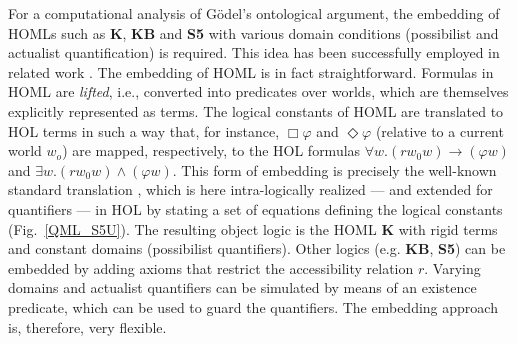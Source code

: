 \documentclass{article}
\newcommand{\imp}{{\rightarrow}}
\begin{document}
For a computational analysis of G\"odel's ontological argument, the embedding of HOMLs such as \textbf{K},
\textbf{KB} and \textbf{S5} with various domain conditions (possibilist and actualist quantification)
is required. This idea has been successfully employed in related work
\cite{C40}. The embedding of HOML is in fact
straightforward. Formulas in HOML are \emph{lifted}, i.e., converted into predicates
over worlds, which are themselves explicitly represented as
terms. The logical constants of HOML are translated to HOL terms in such a way that, for instance, 
$\Box \varphi$ and $\Diamond \varphi$ (relative to a current world
$w_o$) are mapped, respectively, to the HOL formulas
$\forall w. (r w_0 w) \imp (\varphi w)$ and
$\exists w. (r w_0 w) \wedge (\varphi w)$. This form of embedding is
precisely the well-known standard translation
\cite{DBLP:journals/logcom/Ohlbach91}, which is here intra-logically
realized --- and extended for quantifiers --- in HOL by stating a set
of equations defining the logical constants (Fig.~\ref{QML_S5U}). The
resulting object logic is the HOML \textbf{K} with rigid terms and constant
domains (possibilist quantifiers). Other logics (e.g. \textbf{KB}, \textbf{S5}) can be
embedded by adding axioms that restrict the accessibility relation
$r$. Varying domains and actualist quantifiers can be simulated by
means of an existence predicate, which can be used to guard the
quantifiers. The embedding approach is, therefore, very flexible.
\end{document}
